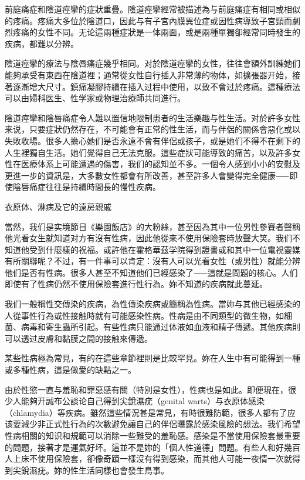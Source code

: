 \documentclass[12pt,UTF8]{ctexbook}
\begin{document}
前庭痛症和陰道痙攣的症狀重疊。陰道痙攣經常被描述為与前庭痛症有相同或相似的疼痛。疼痛大多位於陰道口，因此与有子宮內膜異位症或因性病導致子宮頸而劇烈疼痛的女性不同。无论這兩種症狀是一体兩面，或是兩種單獨卻經常同時發生的疾病，都難以分辨。

陰道痙攣的療法与陰唇痛症幾乎相同。对於陰道痙攣的女性，往往會額外訓練她们能夠承受有東西在陰道裡；通常從女性自行插入非常薄的物体，如擴張器开始，接著逐漸增大尺寸。鎮痛凝膠持續在插入过程中使用，以致不會过於疼痛。這種療法可以由婦科医生、性学家或物理治療師共同進行。

陰道痙攣和陰唇痛症令人難以置信地限制患者的生活樂趣与性生活。对於許多女性来说，只要症狀仍然存在，不可能會有正常的性生活，而与伴侶的關係會惡化或以失敗收場。很多人擔心她们是否永遠不會有伴侶或孩子，或是她们不得不在剩下的人生裡獨自生活。她们覺得自己无法克服。這些症狀可能導致的痛苦，以及許多女性在医療体系上可能遭遇的傷害，我们的認知並不多。一個令人感到小小的安慰及更進一步的資訊是，大多數女性都會有所改善，甚至許多人會變得完全健康⸺即使陰唇痛症往往是持續時間長的慢性疾病。





衣原体、淋病及它的遠房親戚




當然，我们是实境節目《樂園飯店》的大粉絲，甚至因為其中一位男性參賽者聲稱他光看女生就知道对方有沒有性病，因此他從來不使用保險套時放聲大笑。我们不知道他受到什麼樣的祝福。或許他在霍格華茲学院得到證書或和其中一位電視靈媒有所關聯呢？不过，有一件事可以肯定：沒有人可以光看女性（或男性）就能分辨他们是否有性病。很多人甚至不知道他们已經感染了⸺這就是問題的核心。人们即使有了性病仍然不使用保險套進行性行為。妳不知道的疾病就此蔓延。

我们一般稱性交傳染的疾病，為性傳染疾病或簡稱為性病。當妳与其他已經感染的人從事性行為或性接触時就有可能感染性病。性病是由不同類型的微生物，如細菌、病毒和寄生蟲所引起。有些性病只能通过体液如血液和精子傳遞。其他疾病則可以透过皮膚和黏膜之間的接触來傳遞。

某些性病極為常見，有的在這些章節裡則是比較罕見。妳在人生中有可能得到一種或多種性病，這是做愛的缺點之一。

由於性慾一直与羞恥和罪惡感有關（特別是女性），性病也是如此。即便現在，很少人能夠开誠布公談论自己得到尖銳濕疣（genital warts）与衣原体感染（chlamydia）等疾病。雖然這些情況甚是常見，有時很難防範，很多人都有了应该要減少非正式性行為的次數避免讓自己的伴侶曝露於感染風險的想法。我们希望性病相關的知识和規範可以消除一些難受的羞恥感。感染是不當使用保險套最重要的問題，接著才是運氣好坏。這並不是妳的「個人性道德」問題。有些人和好幾百人上床不使用保險套，卻像奇蹟一樣沒有得到感染，而其他人可能一夜情一次就得到尖銳濕疣。妳的性生活同樣也會發生鳥事。
\end{document}
